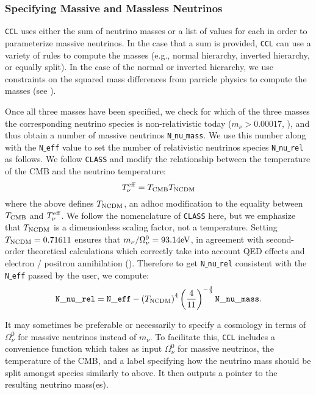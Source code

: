 \documentclass[\docopts]{\docclass}
\newcommand{\ccl}{{\tt CCL}\xspace}
\begin{document}
\subsubsection{Specifying Massive and Massless Neutrinos}

\ccl uses either the sum of neutrino masses or a list of values for each in order
to parameterize massive neutrinos. In the case that a sum is provided, \ccl can
use a variety of rules to compute the masses (e.g., normal hierarchy,
inverted hierarchy, or equally split). In the case of the normal or inverted
hierarchy, we use constraints on the squared mass differences from parricle physics
to compute the masses (see \citealt{Lesgourgues2012, Gerbino2017}).

Once all three masses have been specified, we check for which of the three masses
the corresponding neutrino species is non-relativistic today ($m_\nu>0.00017$,
\citealt{Lesgourgues2012}), and thus obtain a number of massive neutrinos
{\tt N$\_$nu$\_$mass}. We use this number along with the {\tt N$\_$eff} value to
set the number of relativistic neutrinos species {\tt N$\_$nu$\_$rel} as follows.
We follow {\tt CLASS} and modify the relationship between the temperature of the
CMB and the neutrino temperature:
\begin{equation}
T_{\nu}^{\rm eff} = T_{\rm CMB} T_{\rm NCDM}
\label{Tnueff}
\end{equation}
where the above defines $T_{\rm NCDM}$, an adhoc modification to the equality
between $T_{\rm CMB}$ and $T_{\nu}^{\rm eff}$. We follow the nomenclature of
{\tt CLASS} here, but we emphasize that $T_{\rm NCDM}$ is a dimensionless
scaling factor, not a temperature. Setting $T_{\rm NCDM}=0.71611$ ensures that
$m_{\nu} / \Omega_{\nu}^0 = 93.14 {\rm eV}$, in agreement with second-order
theoretical calculations which correctly take into account QED effects and
electron / positron annihilation (\citealt{Mangano2005}). Therefore to get
{\tt N$\_$nu$\_$rel} consistent with the {\tt N$\_$eff} passed by the user, we compute:
\begin{equation}
{\tt N\_nu\_rel} = {\tt N\_eff} - \left(T_{\rm NCDM}\right)^{4} \left(\frac{4}{11}\right)^{-\frac{4}{3}} {\tt N\_nu\_mass}.
\label{Nnurel}
\end{equation}

It may sometimes be preferable or necessarily to specify a cosmology in terms
of $\Omega_\nu^0$ for massive neutrinos instead of $m_\nu$. To facilitate this,
\ccl includes a convenience function which takes as input $\Omega_\nu^0$ for
massive neutrinos, the temperature of the CMB, and a label specifying how the
neutrino mass should be split amongst species similarly to above. It then
outputs a pointer to the resulting neutrino mass(es).
\end{document}
